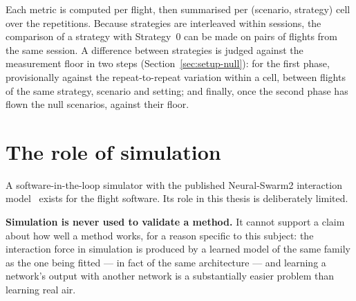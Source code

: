 Each metric is computed per flight, then summarised per (scenario, strategy) cell over the
repetitions. Because strategies are interleaved within sessions, the comparison of a strategy with
Strategy~0 can be made on pairs of flights from the same session.
A difference between strategies is judged against the measurement floor in two steps
(Section~\ref{sec:setup-null}): for the first phase, provisionally against the repeat-to-repeat
variation within a cell, between flights of the same strategy, scenario and setting; and finally,
once the second phase has flown the null scenarios, against their floor.

\section{The role of simulation}
\label{sec:setup-sim}

A software-in-the-loop simulator with the published Neural-Swarm2 interaction
model~\cite{shi2022neuralswarm2} exists for the flight software. Its role in this thesis is
deliberately limited.

\textbf{Simulation is never used to validate a method.} It cannot support a claim about how well a
method works, for a reason specific to this subject: the interaction force in simulation is produced by a learned model
of the same family as the one being fitted --- in fact of the same architecture --- and learning a
network's output with another network is a substantially easier problem than learning real air.

